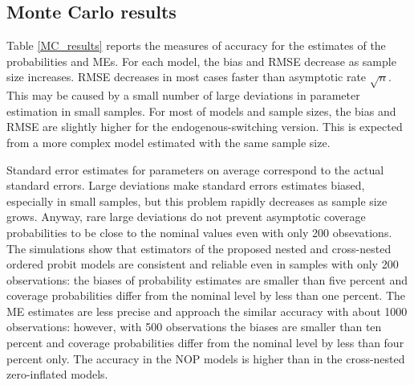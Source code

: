 \documentclass[letterpaper,fleqn,12pt]{article}
\begin{document}
\begin{onehalfspace}
\subsection*{Monte Carlo results}

Table \ref{MC_results} reports the measures of accuracy for the estimates of
the probabilities and MEs. For each model, the bias and RMSE decrease as
sample size increases. RMSE decreases in most cases faster than asymptotic
rate $\sqrt{n}$. This may be caused by a small number of large deviations in
parameter estimation in small samples. For most of models and sample sizes,
the bias and RMSE are slightly higher for the endogenous-switching version.
This is expected from a more complex model estimated with the same sample
size.

Standard error estimates for parameters on average correspond to the actual
standard errors. Large deviations make standard errors estimates biased,
especially in small samples, but this problem rapidly decreases as sample
size grows. Anyway, rare large deviations do not prevent asymptotic coverage
probabilities to be close to the nominal values even with only 200
obsevations. The simulations show that estimators of the proposed nested and
cross-nested ordered probit models are consistent and reliable even in
samples with only 200 observations: the biases of probability estimates are
smaller than five percent and coverage probabilities differ from the nominal
level by less than one percent. The ME estimates are less precise and
approach the similar accuracy with about 1000 observations: however, with
500 observations the biases are smaller than ten percent and coverage
probabilities differ from the nominal level by less than four percent only.
The accuracy in the NOP models is higher than in the cross-nested
zero-inflated models.

\end{onehalfspace}%
\end{document}
